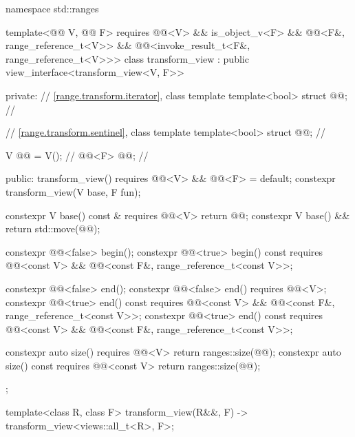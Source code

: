 %
%
%
\begin{codeblock}
namespace std::ranges {
  template<@@ V, @@ F>
    requires @@<V> && is_object_v<F> &&
             @@<F&, range_reference_t<V>> &&
             @@<invoke_result_t<F&, range_reference_t<V>>>
  class transform_view : public view_interface<transform_view<V, F>> {
  private:
    // \ref{range.transform.iterator}, class template 
    template<bool> struct @@;             // \expos

    // \ref{range.transform.sentinel}, class template 
    template<bool> struct @@;             // \expos

    V @@ = V();                              // \expos
    @@<F> @@;                        // \expos

  public:
    transform_view() requires @@<V> && @@<F> = default;
    constexpr transform_view(V base, F fun);

    constexpr V base() const & requires @@<V> { return @@; }
    constexpr V base() && { return std::move(@@); }

    constexpr @@<false> begin();
    constexpr @@<true> begin() const
      requires @@<const V> &&
               @@<const F&, range_reference_t<const V>>;

    constexpr @@<false> end();
    constexpr @@<false> end() requires @@<V>;
    constexpr @@<true> end() const
      requires @@<const V> &&
               @@<const F&, range_reference_t<const V>>;
    constexpr @@<true> end() const
      requires @@<const V> &&
               @@<const F&, range_reference_t<const V>>;

    constexpr auto size() requires @@<V> { return ranges::size(@@); }
    constexpr auto size() const requires @@<const V>
    { return ranges::size(@@); }
  };

  template<class R, class F>
    transform_view(R&&, F) -> transform_view<views::all_t<R>, F>;
}
\end{codeblock}

